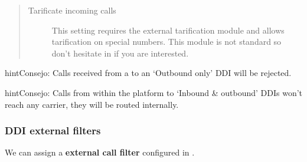 \documentclass[letterpaper,10pt,spanish]{sphinxmanual}
\begin{document}
\begin{quote}
\begin{description}
\item[{Tarificate incoming calls}] \leavevmode
This setting requires the external tarification module and allows
tarification on special numbers. This module is not standard so don't
hesitate in {\hyperref[basic_concepts/intro/getting_help:getting\string-help]{}} if you are interested.

\end{description}
\end{quote}

\begin{notice}{hint}{Consejo:}
Calls received from a {\hyperref[administration_portal/brand/providers/ddi_providers:ddi\string-providers]{}} to an `Outbound only'
DDI will be rejected.
\end{notice}

\begin{notice}{hint}{Consejo:}
Calls from within the platform to `Inbound \& outbound' DDIs won't reach
any carrier, they will be routed internally.
\end{notice}


\subsubsection{DDI external filters}
\label{administration_portal/client/vpbx/ddis:ddi-external-filters}
We can assign a \textbf{external call filter} configured in {\hyperref[administration_portal/client/vpbx/routing_tools/external_call_filters:external\string-call\string-filters]{}}.
\end{document}
